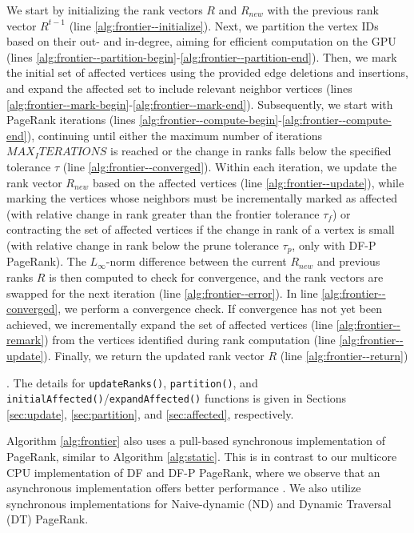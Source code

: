 We start by initializing the rank vectors $R$ and $R_{new}$ with the previous rank vector $R^{t-1}$ (line \ref{alg:frontier--initialize}). Next, we partition the vertex IDs based on their out- and in-degree, aiming for efficient computation on the GPU (lines \ref{alg:frontier--partition-begin}-\ref{alg:frontier--partition-end}). Then, we mark the initial set of affected vertices using the provided edge deletions and insertions, and expand the affected set to include relevant neighbor vertices (lines \ref{alg:frontier--mark-begin}-\ref{alg:frontier--mark-end}). Subsequently, we start with PageRank iterations (lines \ref{alg:frontier--compute-begin}-\ref{alg:frontier--compute-end}), continuing until either the maximum number of iterations $MAX_ITERATIONS$ is reached or the change in ranks falls below the specified tolerance $\tau$ (line \ref{alg:frontier--converged}). Within each iteration, we update the rank vector $R_{new}$ based on the affected vertices (line \ref{alg:frontier--update}), while marking the vertices whose neighbors must be incrementally marked as affected (with relative change in rank greater than the frontier tolerance $\tau_f$) or contracting the set of affected vertices if the change in rank of a vertex is small (with relative change in rank below the prune tolerance $\tau_p$, only with DF-P PageRank). The $L_\infty$-norm difference between the current $R_{new}$ and previous ranks $R$ is then computed to check for convergence, and the rank vectors are swapped for the next iteration (line \ref{alg:frontier--error}). In line \ref{alg:frontier--converged}, we perform a convergence check. If convergence has not yet been achieved, we incrementally expand the set of affected vertices (line \ref{alg:frontier--remark}) from the vertices identified during rank computation (line \ref{alg:frontier--update}). Finally, we return the updated rank vector $R$ (line \ref{alg:frontier--return}). The details for \texttt{updateRanks()}, \texttt{partition()}, and \texttt{initialAffected()}/\texttt{expandAffected()} functions is given in Sections \ref{sec:update}, \ref{sec:partition}, and \ref{sec:affected}, respectively.

Algorithm \ref{alg:frontier} also uses a pull-based synchronous implementation of PageRank, similar to Algorithm \ref{alg:static}. This is in contrast to our multicore CPU implementation of DF and DF-P PageRank, where we observe that an asynchronous implementation offers better performance \cite{sahu2024df, sahu2024incrementally}. We also utilize synchronous implementations for Naive-dynamic (ND) and Dynamic Traversal (DT) PageRank.


